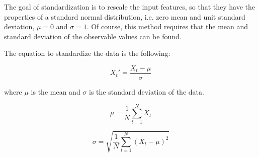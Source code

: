 \documentclass[a4paper, 12pt]{article}
\numberwithin{equation}{section}
\numberwithin{figure}{section}
\numberwithin{table}{section}
\begin{document}
	The goal of standardization is to rescale the input features, so that they have the properties of a standard normal distribution, i.e. zero mean and unit standard deviation, $\mu=0 $ and $ \sigma=1$. Of course, this method requires that the mean and standard deviation of the observable values can be found.\par
	
	\vspace*{0.5cm}
	
	\noindent The equation to standardize the data is the following:
	
	\begin{equation} \label{eq:standardization}
		X_t' = \frac{X_t - \mu}{\sigma}
	\end{equation}
	
	\vspace*{0.5cm}
	
	\noindent where $\mu$ is the mean and $\sigma$ is the standard deviation of the data.
	
	\noindent\begin{minipage}{0.5\linewidth}
		\centering
		\begin{equation}
			\mu = \frac{1}{N} \sum_{t=1}^{N}X_t
		\end{equation}
	\end{minipage}
	\begin{minipage}{0.5\linewidth}
		\centering
		\begin{equation}
			\sigma = \sqrt {\frac{1}{N} \sum_{t=1}^{N}(X_t - \mu)^{2}}
		\end{equation}
	\end{minipage}
	
\end{document}
